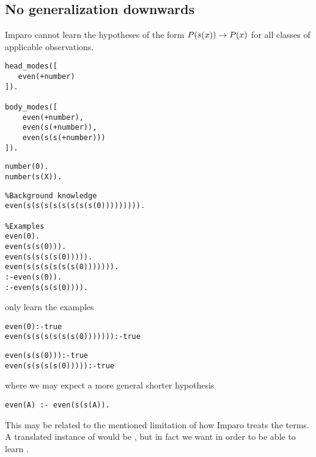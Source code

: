 \subsection{No generalization downwards}
Imparo cannot learn the hypotheses of the form $P(s(x)) \to P(x)$ for all classes of applicable observations.

\begin{minipage}[t]{.25\textwidth}
\begin{lstlisting}
head_modes([
   even(+number)
]).

body_modes([
    even(+number),
    even(s(+number)),
    even(s(s(+number)))
]).
\end{lstlisting}
\end{minipage}
\begin{minipage}[t]{.20\textwidth}
\begin{lstlisting}
number(0).
number(s(X)).

\end{lstlisting}
\end{minipage}
\begin{minipage}[t]{.25\textwidth}
\begin{lstlisting}
%Background knowledge
even(s(s(s(s(s(s(s(s(0))))))))).

%Examples
even(0).
even(s(s(0))).
even(s(s(s(s(0))))).
even(s(s(s(s(s(s(0))))))).
:-even(s(0)).
:-even(s(s(s(0)))).
\end{lstlisting}
\end{minipage}


only learn the examples

\begin{minipage}[t]{.45\textwidth}
\begin{lstlisting}
even(0):-true
even(s(s(s(s(s(s(0))))))):-true
\end{lstlisting}
\end{minipage}
\begin{minipage}[t]{.20\textwidth}
\begin{lstlisting}
even(s(s(0))):-true
even(s(s(s(s(0))))):-true
\end{lstlisting}
\end{minipage}


where we may expect a more general shorter hypothesis

\begin{lstlisting}
even(A) :- even(s(s(A)).
\end{lstlisting}
This may be related to the mentioned limitation of how Imparo treats the terms. A translated instance of  would be
, but in fact we want  in order to be able to learn
.

